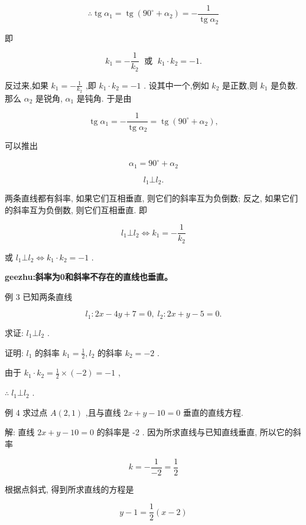 \documentclass[lang=cn,newtx,10pt,scheme=chinese]{elegantbook}
\begin{document}
\[
  \therefore \operatorname{tg}{\alpha }_{1} = \operatorname{tg}\left( {{90}^{ \circ } + {\alpha }_{2}}\right) = - \frac{1}{\operatorname{tg}{\alpha }_{2}}
\]

即

\[
    {k}_{1} = - \frac{1}{{k}_{2}}\;\text{ 或 }\;{k}_{1} \cdot {k}_{2} = - 1.
\]

反过来,如果 \({k}_{1} = - \frac{1}{{k}_{2}}\) ,即 \({k}_{1} \cdot {k}_{2} = - 1\) . 设其中一个,例如 \({k}_{2}\) 是正数,则 \({k}_{1}\) 是负数. 那么 \({\alpha }_{2}\) 是锐角, \({\alpha }_{1}\) 是钝角. 于是由

\[
  \operatorname{tg}{\alpha }_{1} = - \frac{1}{\operatorname{tg}{\alpha }_{2}} = \operatorname{tg}\left( {{90}^{ \circ } + {\alpha }_{2}}\right) ,
\]

可以推出

\[
    {\alpha }_{1} = {90}^{ \circ } + {\alpha }_{2}
\]

\[
    {l}_{1} \bot {l}_{2}\text{.}
\]
\begin{corollary}
两条直线都有斜率, 如果它们互相垂直, 则它们的斜率互为负倒数; 反之, 如果它们的斜率互为负倒数, 则它们互相垂直. 即

\[
    {l}_{1} \bot {l}_{2} \Leftrightarrow {k}_{1} = - \frac{1}{{k}_{2}}
\]

或 \({l}_{1} \bot {l}_{2} \Leftrightarrow {k}_{1} \cdot {k}_{2} = - 1\) .
\end{corollary}

\textbf{geezhu:斜率为0和斜率不存在的直线也垂直。}

例 3 已知两条直线

\[
    {l}_{1} : {2x} - {4y} + 7 = 0,\;{l}_{2} : {2x} + y - 5 = 0.
\]

求证: \({l}_{1} \bot {l}_{2}\) .

证明: \({l}_{1}\) 的斜率 \({k}_{1} = \frac{1}{2},{l}_{2}\) 的斜率 \({k}_{2} = - 2\) .

由于 \({k}_{1} \cdot {k}_{2} = \frac{1}{2} \times \left( {-2}\right) = - 1\) ,

\(\therefore \;{l}_{1} \bot {l}_{2}\) .

例 4 求过点 \(A\left( {2,1}\right)\) ,且与直线 \({2x} + y - {10} = 0\) 垂直的直线方程.

解: 直线 \({2x} + y - {10} = 0\) 的斜率是 -2 . 因为所求直线与已知直线垂直, 所以它的斜率

\[
  k = - \frac{1}{-2} = \frac{1}{2}
\]

根据点斜式, 得到所求直线的方程是

\[
  y - 1 = \frac{1}{2}\left( {x - 2}\right)
\]
\end{document}
